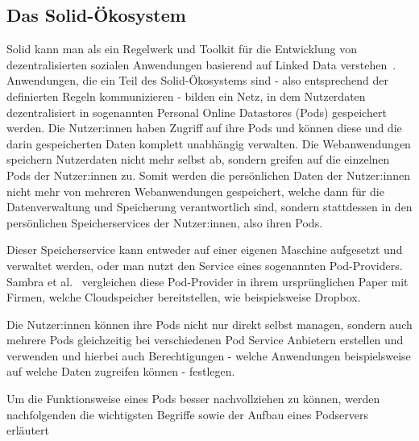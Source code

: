 \documentclass[acmtog]{acmart}
\begin{document}
\subsection{Das Solid-Ökosystem} \label{subsection:solideco}

Solid kann man als ein Regelwerk und Toolkit für die Entwicklung von dezentralisierten sozialen Anwendungen basierend auf Linked Data verstehen~\cite{ramachandran2020towards}. Anwendungen, die ein Teil des Solid-Ökosystems sind - also entsprechend der definierten Regeln kommunizieren - bilden ein Netz, in dem Nutzerdaten dezentralisiert in sogenannten Personal Online Datastores (Pods) gespeichert werden. Die Nutzer:innen haben Zugriff auf ihre Pods und können diese und die darin gespeicherten Daten komplett unabhängig verwalten. Die Webanwendungen speichern Nutzerdaten nicht mehr selbst ab, sondern greifen auf die einzelnen Pods der Nutzer:innen zu. Somit werden die persönlichen Daten der Nutzer:innen nicht mehr von mehreren Webanwendungen gespeichert, welche dann für die Datenverwaltung und Speicherung verantwortlich sind, sondern stattdessen in den persönlichen Speicherservices der Nutzer:innen, also ihren Pods.


Dieser Speicherservice kann entweder auf einer eigenen Maschine aufgesetzt und verwaltet werden, oder man nutzt den Service eines sogenannten Pod-Providers. Sambra et al.~\cite{sambra2016solid} vergleichen diese Pod-Provider in ihrem ursprünglichen Paper mit Firmen, welche Cloudspeicher bereitstellen, wie beispielsweise Dropbox.

Die Nutzer:innen können ihre Pods nicht nur direkt selbst managen, sondern auch mehrere Pods gleichzeitig bei verschiedenen Pod Service Anbietern erstellen und verwenden und hierbei auch Berechtigungen - welche Anwendungen beispielsweise auf welche Daten zugreifen können - festlegen.

Um die Funktionsweise eines Pods besser nachvollziehen zu können, werden nachfolgenden die wichtigsten Begriffe sowie der Aufbau eines Podservers erläutert
\end{document}
